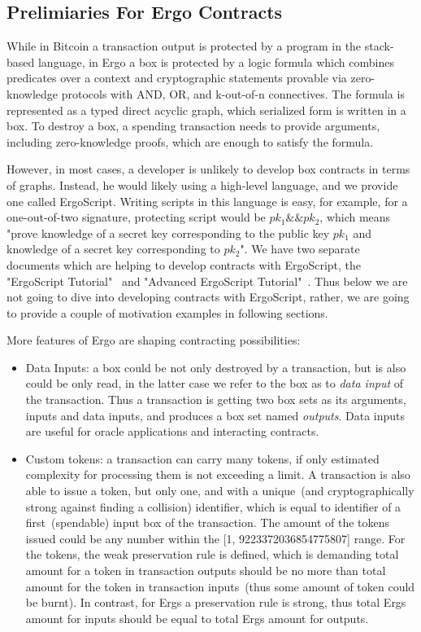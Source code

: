 \subsection{Prelimiaries For Ergo Contracts}

  While in Bitcoin a transaction output is protected by a program in the stack-based language, in Ergo a
 box is protected by a logic formula which combines predicates over a context and cryptographic statements provable
 via zero-knowledge protocols with AND, OR, and k-out-of-n connectives. The formula is represented as a typed direct
 acyclic graph, which serialized form is written in a box. To destroy a box, a spending transaction needs to provide
 arguments, including zero-knowledge proofs, which are enough to satisfy the formula.

 However, in most cases, a developer is unlikely to develop box contracts in terms of graphs. Instead, he would likely
 using a high-level language, and we provide one called ErgoScript. Writing scripts in this language is easy, for
 example, for a one-out-of-two signature, protecting script would be ${pk_1 \&\& pk_2}$, which means "prove knowledge of
 a secret key corresponding to the public key $pk_1$ and knowledge of a secret key corresponding to $pk_2$". We have
 two separate documents which are helping to develop contracts with ErgoScript, the "ErgoScript Tutorial"~\cite{ergoTutorial}
 and "Advanced ErgoScript Tutorial"~\cite{ergoAdvTutorial}. Thus below we are not going to dive into developing contracts with
 ErgoScript, rather, we are going to provide a couple of motivation examples in following sections.

 More features of Ergo are shaping contracting possibilities:

 \begin{itemize}
    \item{Data Inputs: }
 a box could be not only destroyed by a transaction, but is also could be only read, in the latter case we refer to the
 box as to {\em data input} of the transaction. Thus a transaction is getting two box sets as its arguments, inputs and
 data inputs, and produces a box set named {\em outputs}. Data inputs are useful for oracle applications and interacting
 contracts.

    \item{Custom tokens: }
 a transaction can carry many tokens, if only estimated complexity for processing them is not exceeding a limit. A
 transaction is also able to issue a token, but only one, and with a unique~(and cryptographically strong against
 finding a collision) identifier, which is equal to identifier of a first~(spendable) input box of the transaction.
 The amount of the tokens issued could be any number within the [1, 9223372036854775807] range. For the tokens, the weak
 preservation rule is defined, which is demanding total amount for a token in transaction outputs should be no more
 than total amount for the token in transaction inputs~(thus some amount of token could be burnt). In contrast, for Ergs
 a preservation rule is strong, thus total Ergs amount for inputs should be equal to total Ergs amount for outputs.
 \end{itemize}

